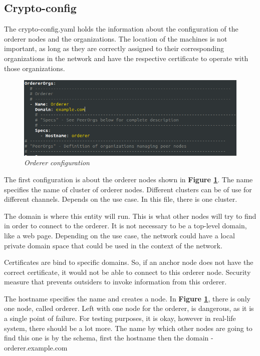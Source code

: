 \documentclass[a4paper,11pt]{report}
\begin{document}
\subsection{Crypto-config}

The crypto-config.yaml holds the information about the configuration of the orderer nodes and the organizations. The location of the machines is not important, as long as they are correctly assigned to their corresponding organizations in the network and have the respective certificate to operate with those organizations.

\begin{figure}[h]
\centering
  \includegraphics[width = 16cm]{cryptoconfig1.png}
  \caption{ \textit{Orderer configuration} }
  \label{cryptoconfig1}
\end{figure}


The first configuration is about the orderer nodes shown in \textbf{Figure \ref{cryptoconfig1}}. The name specifies the name of cluster of orderer nodes. Different clusters can be of use for different channels. Depends on the use case. In this file, there is one cluster.

The domain is where this entity will run. This is what other nodes will try to find in order to connect to the orderer. It is not necessary to be a top-level domain, like a web page. Depending on the use case, the network could have a local private domain space that could be used in the context of the network.

Certificates are bind to specific domains. So, if an anchor node does not have the correct certificate, it would not be able to connect to this orderer node. Security measure that prevents outsiders to invoke information from this orderer.

The hostname specifies the name and creates a node. In \textbf{Figure \ref{cryptoconfig1}}, there is only one node, called orderer. Left with one node for the orderer, is dangerous, as it is a single point of failure. For testing purposes, it is okay, however in real-life system, there should be a lot more. The name by which other nodes are going to find this one is by the schema, first the hostname then the domain - orderer.example.com
\end{document}
